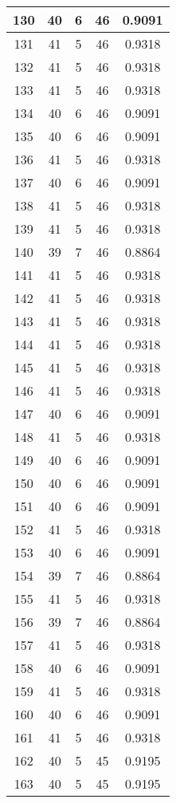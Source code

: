 \documentclass[letterpaper, 12pt]{article}
\begin{document}
\begin{longtable}{|c|c|c|c|c|}
\hline
130 & 40 & 6 & 46 & 0.9091 \\
\hline
131 & 41 & 5 & 46 & 0.9318 \\
\hline
132 & 41 & 5 & 46 & 0.9318 \\
\hline
133 & 41 & 5 & 46 & 0.9318 \\
\hline
134 & 40 & 6 & 46 & 0.9091 \\
\hline
135 & 40 & 6 & 46 & 0.9091 \\
\hline
136 & 41 & 5 & 46 & 0.9318 \\
\hline
137 & 40 & 6 & 46 & 0.9091 \\
\hline
138 & 41 & 5 & 46 & 0.9318 \\
\hline
139 & 41 & 5 & 46 & 0.9318 \\
\hline
140 & 39 & 7 & 46 & 0.8864 \\
\hline
141 & 41 & 5 & 46 & 0.9318 \\
\hline
142 & 41 & 5 & 46 & 0.9318 \\
\hline
143 & 41 & 5 & 46 & 0.9318 \\
\hline
144 & 41 & 5 & 46 & 0.9318 \\
\hline
145 & 41 & 5 & 46 & 0.9318 \\
\hline
146 & 41 & 5 & 46 & 0.9318 \\
\hline
147 & 40 & 6 & 46 & 0.9091 \\
\hline
148 & 41 & 5 & 46 & 0.9318 \\
\hline
149 & 40 & 6 & 46 & 0.9091 \\
\hline
150 & 40 & 6 & 46 & 0.9091 \\
\hline
151 & 40 & 6 & 46 & 0.9091 \\
\hline
152 & 41 & 5 & 46 & 0.9318 \\
\hline
153 & 40 & 6 & 46 & 0.9091 \\
\hline
154 & 39 & 7 & 46 & 0.8864 \\
\hline
155 & 41 & 5 & 46 & 0.9318 \\
\hline
156 & 39 & 7 & 46 & 0.8864 \\
\hline
157 & 41 & 5 & 46 & 0.9318 \\
\hline
158 & 40 & 6 & 46 & 0.9091 \\
\hline
159 & 41 & 5 & 46 & 0.9318 \\
\hline
160 & 40 & 6 & 46 & 0.9091 \\
\hline
161 & 41 & 5 & 46 & 0.9318 \\
\hline
162 & 40 & 5 & 45 & 0.9195 \\
\hline
163 & 40 & 5 & 45 & 0.9195 \\

\end{longtable}
\end{document}
